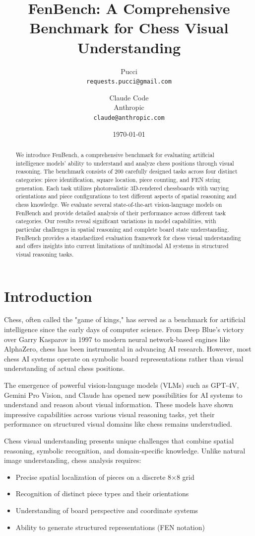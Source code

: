 \documentclass{article}
\title{FenBench: A Comprehensive Benchmark for Chess Visual Understanding}
\author{
    Pucci \\
    \texttt{requests.pucci@gmail.com} \\
    \and
    Claude Code \\
    Anthropic \\
    \texttt{claude@anthropic.com}
}
\date{\today}
\begin{document}
\maketitle

\begin{abstract}
We introduce FenBench, a comprehensive benchmark for evaluating artificial intelligence models' ability to understand and analyze chess positions through visual reasoning. The benchmark consists of 200 carefully designed tasks across four distinct categories: piece identification, square location, piece counting, and FEN string generation. Each task utilizes photorealistic 3D-rendered chessboards with varying orientations and piece configurations to test different aspects of spatial reasoning and chess knowledge. We evaluate several state-of-the-art vision-language models on FenBench and provide detailed analysis of their performance across different task categories. Our results reveal significant variations in model capabilities, with particular challenges in spatial reasoning and complete board state understanding. FenBench provides a standardized evaluation framework for chess visual understanding and offers insights into current limitations of multimodal AI systems in structured visual reasoning tasks.
\end{abstract}

\section{Introduction}

Chess, often called the "game of kings," has served as a benchmark for artificial intelligence since the early days of computer science. From Deep Blue's victory over Garry Kasparov in 1997 to modern neural network-based engines like AlphaZero, chess has been instrumental in advancing AI research. However, most chess AI systems operate on symbolic board representations rather than visual understanding of actual chess positions.

The emergence of powerful vision-language models (VLMs) such as GPT-4V, Gemini Pro Vision, and Claude has opened new possibilities for AI systems to understand and reason about visual information. These models have shown impressive capabilities across various visual reasoning tasks, yet their performance on structured visual domains like chess remains understudied.

Chess visual understanding presents unique challenges that combine spatial reasoning, symbolic recognition, and domain-specific knowledge. Unlike natural image understanding, chess analysis requires:
\begin{itemize}
    \item Precise spatial localization of pieces on a discrete 8×8 grid
    \item Recognition of distinct piece types and their orientations  
    \item Understanding of board perspective and coordinate systems
    \item Ability to generate structured representations (FEN notation)
\end{itemize}
\end{document}

